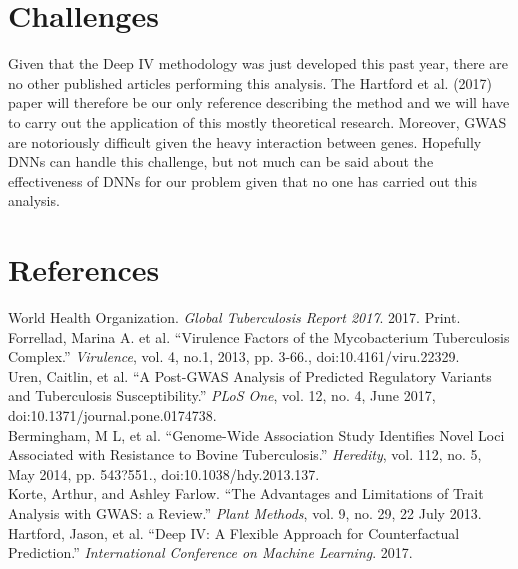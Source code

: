 \documentclass[11pt, oneside]{article}   	%
\begin{document}
\section{Challenges}
Given that the Deep IV methodology was just developed this past year, there are no other published articles performing this analysis. The Hartford et al. (2017) paper will therefore be our only reference describing the method and we will have to carry out the application of this mostly theoretical research. Moreover, GWAS are notoriously difficult given the heavy interaction between genes. Hopefully DNNs can handle this challenge, but not much can be said about the effectiveness of DNNs for our problem given that no one has carried out this analysis.

\pagebreak

\section{References}

\noindent [1] World Health Organization. \emph{Global Tuberculosis Report 2017}. 2017. Print.\\

\noindent [2] Forrellad, Marina A. et al. ``Virulence Factors of the Mycobacterium Tuberculosis Complex.'' \emph{Virulence}, vol. 4, no.1, 2013, pp. 3-66., doi:10.4161/viru.22329.\\

\noindent [3] Uren, Caitlin, et al. ``A Post-GWAS Analysis of Predicted Regulatory Variants and Tuberculosis Susceptibility.'' \emph{PLoS One}, vol. 12, no. 4, June 2017, doi:10.1371/journal.pone.0174738.\\

\noindent [4] Bermingham, M L, et al. ``Genome-Wide Association Study Identifies Novel Loci Associated with Resistance to Bovine Tuberculosis.'' \emph{Heredity}, vol. 112, no. 5, May 2014, pp. 543?551., doi:10.1038/hdy.2013.137.\\

\noindent [5] Korte, Arthur, and Ashley Farlow. ``The Advantages and Limitations of Trait Analysis with GWAS: a Review.'' \emph{Plant Methods}, vol. 9, no. 29, 22 July 2013.\\

\noindent [6] Hartford, Jason, et al. ``Deep IV: A Flexible Approach for Counterfactual Prediction.'' \emph{International Conference on Machine Learning}. 2017.
\end{document}
